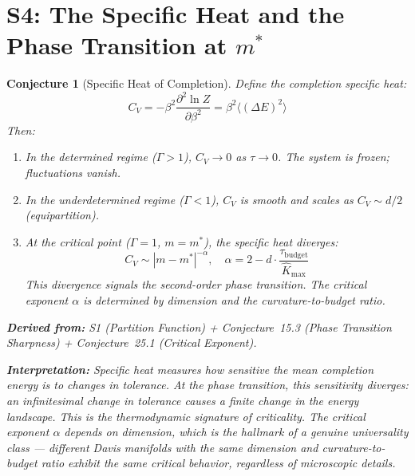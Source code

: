 \documentclass[11pt,letterpaper]{article}
\newtheorem{conjecture}{Conjecture}[section]
\newcommand{\Khat}{\hat{K}}
\newcommand{\tbudget}{\tau_{\mathrm{budget}}}
\begin{document}
\newpage
\section{S4: The Specific Heat and the Phase Transition at $m^*$}

\begin{conjecture}[Specific Heat of Completion]\label{conj:specific_heat}
Define the \emph{completion specific heat}:
\begin{equation}\label{eq:specific_heat}
    C_V = -\beta^2 \frac{\partial^2 \ln Z}{\partial \beta^2} 
    = \beta^2 \langle (\Delta E)^2 \rangle
\end{equation}
Then:

\begin{enumerate}[label=(\alph*)]
    \item In the determined regime ($\Gamma > 1$), $C_V \to 0$ as 
    $\tau \to 0$. The system is frozen; fluctuations vanish.
    
    \item In the underdetermined regime ($\Gamma < 1$), $C_V$ is smooth 
    and scales as $C_V \sim d/2$ (equipartition).
    
    \item At the critical point ($\Gamma = 1$, $m = m^*$), the specific 
    heat diverges:
    \begin{equation}\label{eq:specific_heat_divergence}
        C_V \sim |m - m^*|^{-\alpha}, \quad 
        \alpha = 2 - d \cdot \frac{\tbudget}{\Khat_{\max}}
    \end{equation}
    This divergence signals the second-order phase transition. The 
    critical exponent $\alpha$ is determined by dimension and the 
    curvature-to-budget ratio.
\end{enumerate}

\textbf{Derived from:} S1 (Partition Function) + Conjecture~15.3 
(Phase Transition Sharpness) + Conjecture~25.1 (Critical Exponent).

\textbf{Interpretation:} Specific heat measures how sensitive the mean 
completion energy is to changes in tolerance. At the phase transition, 
this sensitivity diverges: an infinitesimal change in tolerance causes a 
finite change in the energy landscape. This is the thermodynamic signature 
of criticality. The critical exponent $\alpha$ depends on dimension, which 
is the hallmark of a genuine universality class --- different Davis 
manifolds with the same dimension and curvature-to-budget ratio exhibit 
the same critical behavior, regardless of microscopic details.
\end{conjecture}
\end{document}

